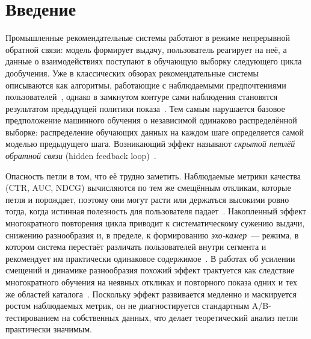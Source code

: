 \section{Введение}
\label{sec:Chapter0} 

Промышленные рекомендательные системы работают в режиме непрерывной обратной
связи: модель формирует выдачу, пользователь реагирует на неё, а данные о
взаимодействиях поступают в обучающую выборку следующего цикла дообучения. Уже в
классических обзорах рекомендательные системы описываются как алгоритмы,
работающие с наблюдаемыми предпочтениями пользователей~\cite{adomavicius2005},
однако в замкнутом контуре сами наблюдения становятся результатом предыдущей
политики показа~\cite{sinha2016, krauth2022}. Тем самым нарушается базовое
предположение машинного обучения о независимой одинаково распределённой выборке:
распределение обучающих данных на каждом шаге определяется самой моделью
предыдущего шага. Возникающий эффект называют \emph{скрытой петлёй обратной
связи} (hidden feedback loop)~\cite{khritankov2021, pagan2023feedbackLoops}.

Опасность петли в том, что её трудно заметить. Наблюдаемые метрики качества
(CTR, AUC, NDCG) вычисляются по тем же смещённым откликам, которые петля и
порождает, поэтому они могут расти или держаться высокими ровно тогда, когда
истинная полезность для пользователя падает~\cite{chaney2018}. Накопленный
эффект многократного повторения цикла приводит к систематическому сужению
выдачи, снижению разнообразия и, в пределе, к формированию \emph{эхо-камер}~---
режима, в котором система перестаёт различать пользователей внутри сегмента и
рекомендует им практически одинаковое содержимое~\cite{nguyen2014, jiang2019}.
В работах об усилении смещений и динамике разнообразия похожий эффект трактуется
как следствие многократного обучения на неявных откликах и повторного показа
одних и тех же областей каталога~\cite{mansoury2020, stoecker2025biasMitigation,
barlacchi2026diversityParadox}.
Поскольку эффект развивается медленно и маскируется ростом наблюдаемых метрик,
он не диагностируется стандартным A/B-тестированием на собственных данных, что
делает теоретический анализ петли практически значимым.

